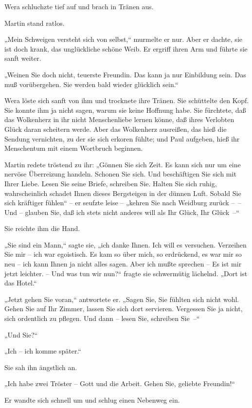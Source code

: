 Wera schluchzte tief auf und brach in Tränen aus.

Martin stand ratlos.

„Mein Schweigen versteht sich von selbst,“ murmelte er nur. Aber er
dachte, sie ist doch krank, das unglückliche schöne Weib. Er
ergriff ihren Arm und führte sie sanft weiter.

„Weinen Sie doch nicht, teuerste Freundin. Das kann ja nur
Einbildung sein. Das muß vorübergehen. Sie werden bald wieder
glücklich sein.“

Wera löste sich sanft von ihm und trocknete ihre Tränen. Sie
schüttelte den Kopf. Sie konnte ihm ja nicht sagen, warum sie keine
Hoffnung habe. Sie fürchtete, daß das Wolkenherz in ihr nicht
Menschenliebe lernen könne, daß ihres Verlobten Glück daran
scheitern werde. Aber das Wolkenherz ausreißen, das hieß die
Sendung vernichten, zu der sie sich erkoren fühlte; und Paul
aufgeben, hieß ihr Menschentum mit einem Wortbruch beginnen.

Martin redete tröstend zu ihr: „Gönnen Sie sich Zeit. Es kann sich
nur um eine nervöse Überreizung handeln. Schonen Sie sich. Und
beschäftigen Sie sich mit Ihrer Liebe. Lesen Sie seine Briefe,
schreiben Sie. Halten Sie sich ruhig, wahrscheinlich schadet Ihnen
dieses Bergsteigen in der dünnen Luft. Sobald Sie sich kräftiger
fühlen“ – er seufzte leise – „kehren Sie nach Weidburg zurück –~–
Und – glauben Sie, daß ich stets nicht anderes will als Ihr Glück,
Ihr Glück~–“

Sie reichte ihm die Hand.

„Sie sind ein Mann,“ sagte sie, „ich danke Ihnen. Ich will es
versuchen. Verzeihen Sie mir – ich war egoistisch. Es kam so über
mich, so erdrückend, es war mir so neu – ich kann Ihnen ja nicht
alles sagen. Aber ich mußte sprechen – Es ist mir jetzt leichter. –
Und was tun wir nun?“ fragte sie schwermütig lächelnd. „Dort ist
das Hotel.“

„Jetzt gehen Sie voran,“ antwortete er. „Sagen Sie, Sie fühlten
sich nicht wohl. Gehen Sie auf Ihr Zimmer, lassen Sie sich dort
servieren. Vergessen Sie ja nicht, sich ordentlich zu pflegen. Und
dann – lesen Sie, schreiben Sie~–“

„Und Sie?“

„Ich – ich komme später.“

Sie sah ihn ängstlich an.

„Ich habe zwei Tröster – Gott und die Arbeit. Gehen Sie, geliebte
Freundin!“

Er wandte sich schnell um und schlug einen Nebenweg ein.

